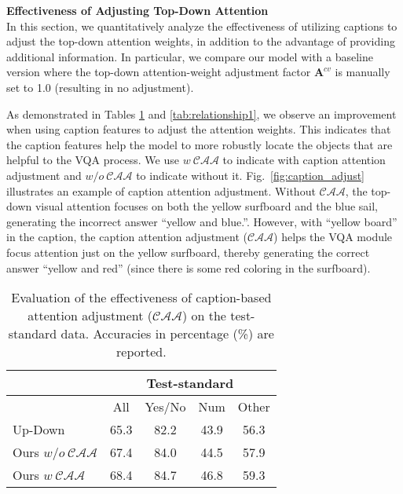 \documentclass[11pt,a4paper]{article}
\begin{document}
\noindent\textbf{Effectiveness of Adjusting Top-Down Attention}\\
In this section, we quantitatively analyze the effectiveness of utilizing captions to adjust the top-down attention weights, in addition to the advantage of providing additional information.
In particular, we compare our model with a baseline version where the top-down attention-weight adjustment factor $\textbf{A}^{cv}$ is manually set to 1.0 (resulting in no adjustment). 

As demonstrated in Tables \ref{tab:relationship} and \ref{tab:relationship1}, we observe an improvement when using caption features to adjust the attention weights. This indicates that the caption features help the model to more robustly locate the objects that are helpful to the VQA process. We use $w~\mathcal{CAA}$ to indicate with caption attention adjustment and $w/o~\mathcal{CAA}$ to indicate without it. Fig.\ \ref{fig:caption_adjust} illustrates an example of caption attention adjustment. Without $\mathcal{CAA}$, the top-down visual attention focuses on both the yellow surfboard and the blue sail, generating the incorrect answer ``yellow and blue.''. However, with ``yellow board'' in the caption, the caption attention adjustment ($\mathcal{CAA}$) helps the VQA module focus attention just on the yellow surfboard, thereby generating the correct answer ``yellow and red'' (since there is some red coloring in the surfboard).
 \begin{table}[h]
\centering
\begin{tabular}{l|cccc}
\hline \toprule
                  & \multicolumn{4}{c}{Test-standard} \\\hline
                  & {\footnotesize All }   & {\footnotesize Yes/No}  & {\footnotesize Num}   & {\footnotesize Other}  \\ \hline\hline
Up-Down              & 65.3   & 82.2    & 43.9  & 56.3  \\
Ours $w/o~\mathcal{CAA}$ & 67.4   & 84.0 & 44.5 & 57.9\\
Ours $w~\mathcal{CAA}$ & 68.4  &  84.7 & 46.8 &  59.3     \\\bottomrule
\end{tabular}
\caption{Evaluation of the effectiveness of caption-based attention adjustment ($\mathcal{CAA}$) on the test-standard data. Accuracies in percentage (\%) are reported.}
\label{tab:relationship}
\end{table}
\end{document}
